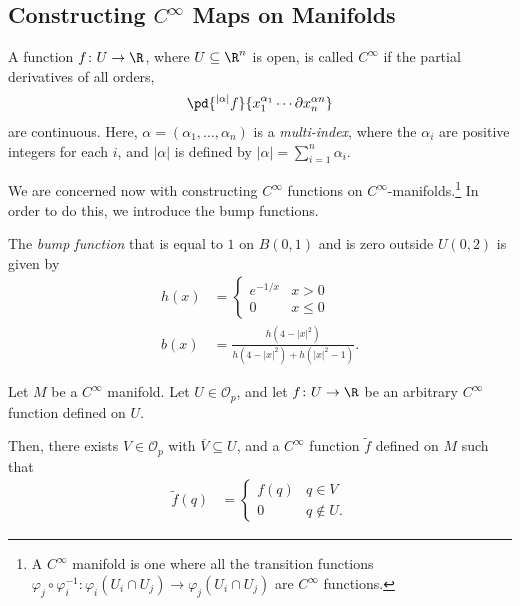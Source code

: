 \documentclass[10pt]{mypackage}
\begin{document}
\subsection{Constructing $C^{\infty}$ Maps on Manifolds}%
\begin{definition}
  A function $f\colon U\rightarrow \R$, where $U\subseteq \R^{n}$ is open, is called $C^{\infty}$ if the partial derivatives of all orders,
  \begin{align*}
    \pd{^{\left\vert \alpha \right\vert}f}{x_1^{\alpha_1}\cdots \partial x_n^{\alpha n}}
  \end{align*}
  are continuous. Here, $\alpha = \left( \alpha_1,\dots,\alpha_n \right)$ is a \textit{multi-index}, where the $\alpha_i$ are positive integers for each $i$, and $\left\vert \alpha \right\vert $ is defined by $ \left\vert \alpha \right\vert = \sum_{i=1}^{n}\alpha_i$.
\end{definition}
We are concerned now with constructing $C^{\infty}$ functions on $C^{\infty}$-manifolds.\footnote{A $C^{\infty}$ manifold is one where all the transition functions $\varphi_{j}\circ\varphi_{i}^{-1}\colon \varphi_{i}\left( U_i\cap U_j \right)\rightarrow \varphi_{j}\left( U_i\cap U_j \right)$ are $C^{\infty}$ functions.} In order to do this, we introduce the bump functions.
\begin{definition}
  The \textit{bump function} that is equal to $1$ on $B\left( 0,1 \right)$ and is zero outside $U\left( 0,2 \right)$ is given by
  \begin{align*}
    h(x) &= \begin{cases}
      e^{-1/x} & x > 0\\
      0 & x\leq 0
    \end{cases}\\
      b(x) &= \frac{h\left( 4-\left\vert x \right\vert^2 \right)}{ h\left( 4-\left\vert x \right\vert^2 \right) + h\left( \left\vert x \right\vert^2 - 1 \right) }.\label{eq:bump_function}\tag{$\ast$}
  \end{align*}
\end{definition}
\begin{lemma}
  Let $M$ be a $C^{\infty}$ manifold. Let $U\in \mathcal{O}_{p}$, and let $f\colon U\rightarrow \R$ be an arbitrary $C^{\infty}$ function defined on $U$.\newline

  Then, there exists $V\in \mathcal{O}_{p}$ with $ \overline{V}\subseteq U $, and a $C^{\infty}$ function $ \widetilde{f} $ defined on $M$ such that
  \begin{align*}
    \widetilde{f}(q) &= \begin{cases}
      f(q) & q\in V\\
      0 & q\notin U.
    \end{cases}
  \end{align*}
\end{lemma}
\end{document}
